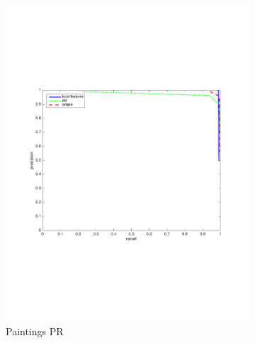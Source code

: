 \documentclass[english,12pt,a4paper,pdftex,elec,utf8, table]{aaltothesis}
\begin{document}
\begin{figure}[htb]
\begin{center}
\begin{subfigure}[b]{0.49\textwidth}
    \includegraphics[width=\textwidth]{figures/53scalePR.pdf}
    \caption{Paintings PR}
    \label{53rocthinglink}
  \end{subfigure}
  \begin{subfigure}[b]{0.49\textwidth}

\end{subfigure}
\end{center}
\end{figure}
\end{document}
